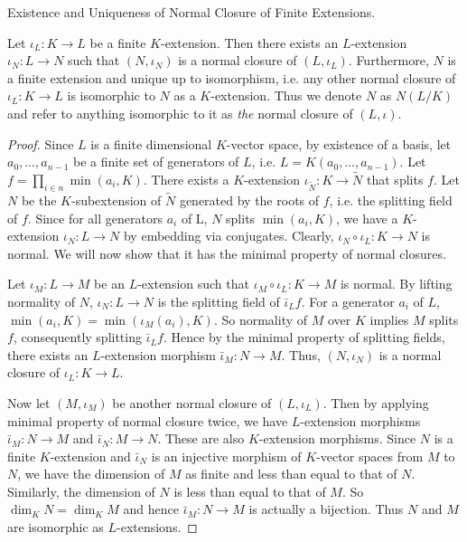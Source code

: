 \documentclass[../book.tex]{subfiles}
\begin{document}
\begin{thm} Existence and Uniqueness of Normal Closure of Finite Extensions.
    
    Let $\iota_L : K \to L$ be a finite $K$-extension. 
    Then there exists an $L$-extension $\iota_N : L \to N$ such that
    $(N,\iota_N)$ is a normal closure of $(L,\iota_L)$.
    Furthermore, $N$ is a finite extension and unique up to isomorphism, i.e.
    any other normal closure of $\iota_L : K \to L$ is
    isomorphic to $N$ as a $K$-extension. 
    Thus we denote $N$ as $N(L/K)$ and 
    refer to anything isomorphic to it as \emph{the} normal closure of $(L,\iota)$.
\end{thm}
\begin{proof}
    Since $L$ is a finite dimensional $K$-vector space,
    by existence of a basis,
    let $a_0,\dots,a_{n-1}$ be a finite set of generators of $L$,
    i.e. $L = K(a_0,\dots,a_{n-1})$.
    Let $f = \prod_{i\in n} \min(a_i,K)$. 
    There exists a $K$-extension $\iota_{\tilde{N}} : K \to \tilde{N}$ 
    that splits $f$. 
    Let $N$ be the $K$-subextension of $\tilde{N}$ generated by the roots of $f$, 
    i.e. the splitting field of $f$. 
    Since for all generators $a_i$ of L, $N$ splits $\min(a_i,K)$,
    we have a $K$-extension $\iota_N : L \to N$ by embedding via conjugates.
    Clearly, $\iota_N\circ\iota_L : K \to N$ is normal. 
    We will now show that it has the minimal property of normal closures. 
    
    Let $\iota_M : L \to M$ be an $L$-extension such that 
    $\iota_M\circ\iota_L : K \to M$ is normal. 
    By lifting normality of $N$, 
    $\iota_N : L \to N$ is the splitting field of $\bar\iota_L f$. 
    For a generator $a_i$ of $L$, $\min(a_i,K) = \min(\iota_M(a_i),K)$. 
    So normality of $M$ over $K$ implies $M$ splits $f$,
    consequently splitting $\bar\iota_L f$. 
    Hence by the minimal property of splitting fields,
    there exists an $L$-extension morphism $\bar\iota_M : N \to M$.
    Thus, $(N,\iota_N)$ is a normal closure of $\iota_L : K \to L$.
    
    Now let $(M,\iota_M)$ be another normal closure of $(L,\iota_L)$. 
    Then by applying minimal property of normal closure twice,
    we have $L$-extension morphisms $\bar\iota_M : N \to M$ 
    and $\bar\iota_N : M \to N$.
    These are also $K$-extension morphisms.
    Since $N$ is a finite $K$-extension and 
    $\bar\iota_N$ is an injective morphism of $K$-vector spaces from $M$ to $N$,
    we have the dimension of $M$ as finite and less than equal to that of $N$. 
    Similarly, the dimension of $N$ is less than equal to that of $M$.
    So $\dim_K N = \dim_K M$ and hence $\bar\iota_M : N \to M$ is actually a bijection.
    Thus $N$ and $M$ are isomorphic as $L$-extensions. 
\end{proof}
\end{document}
